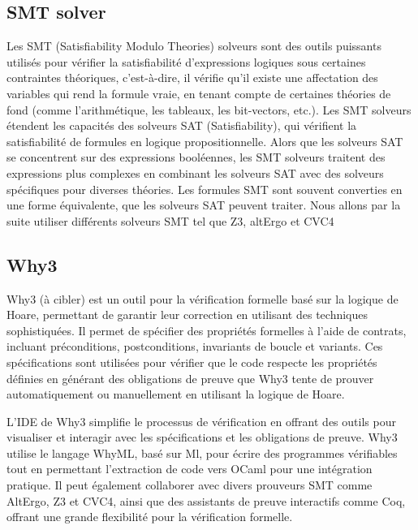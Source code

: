 \documentclass[11pt]{article}
\begin{document}
\subsection{SMT solver}
\label{sec:org2551d30}

Les SMT (Satisfiability Modulo Theories) solveurs sont des outils puissants utilisés pour 
vérifier la satisfiabilité d'expressions logiques sous certaines contraintes théoriques, 
c'est-à-dire, il vérifie qu'il existe une affectation des variables qui rend la formule vraie, 
en tenant compte de certaines théories de fond (comme l'arithmétique, les tableaux, les bit-vectors, etc.).
Les SMT solveurs étendent les capacités des solveurs SAT (Satisfiability), 
qui vérifient la satisfiabilité de formules en logique propositionnelle. 
Alors que les solveurs SAT se concentrent sur des expressions booléennes, 
les SMT solveurs traitent des expressions plus complexes en combinant les solveurs SAT avec des solveurs spécifiques pour diverses théories.
Les formules SMT sont souvent converties en une forme équivalente, que les solveurs SAT peuvent traiter.
Nous allons par la suite utiliser différents solveurs SMT tel que Z3, altErgo et CVC4

\subsection{Why3}
\label{sec:org40daa76}

Why3 (à cibler) est un outil pour la vérification formelle basé sur la logique de Hoare, 
permettant de garantir leur correction en utilisant des techniques sophistiquées. 
Il permet de spécifier des propriétés formelles à l'aide de contrats, incluant préconditions, postconditions, 
invariants de boucle et variants. 
Ces spécifications sont utilisées pour vérifier que le code respecte les propriétés définies en générant des obligations de preuve que Why3
tente de prouver automatiquement ou manuellement en utilisant la logique de Hoare.

L'IDE de Why3 simplifie le processus de vérification en offrant des outils 
pour visualiser et interagir avec les spécifications et les obligations de preuve. 
Why3 utilise le langage WhyML, basé sur Ml, pour écrire des programmes vérifiables tout en permettant 
l'extraction de code vers OCaml pour une intégration pratique. 
Il peut également collaborer avec divers prouveurs SMT comme AltErgo, Z3 et CVC4, 
ainsi que des assistants de preuve interactifs comme Coq, 
offrant une grande flexibilité pour la vérification formelle.
\end{document}
